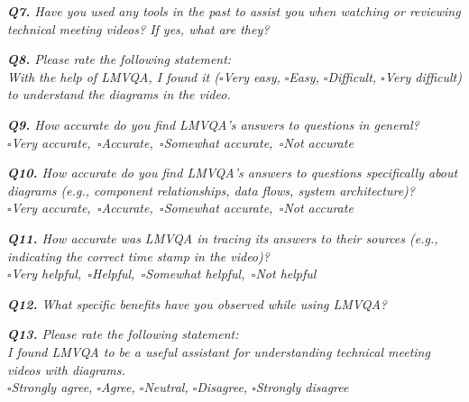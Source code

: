 \vspace*{1em}\noindent\textit{\textbf{Q7.} Have you used any tools in the past to assist you when watching or reviewing technical meeting videos? If yes, what are they?
}







\vspace*{1em}\noindent\textit{\textbf{Q8.} Please rate the following statement:
\\[.5em]
 \textit{With the help of LMVQA, I found it}
($\square$Very easy, $\square$Easy, $\square$Difficult, $\square$Very difficult)
to understand the diagrams in the video.
}


\vspace*{1em}\noindent\textit{\textbf{Q9.} How accurate do you find LMVQA's answers to questions in general?
\\[.5em]
        \indent $\square$Very accurate,\,
        $\square$Accurate,\,
        $\square$Somewhat accurate,\,
        $\square$Not accurate
}



\vspace*{1em}
\noindent\textit{\textbf{Q10.} How accurate do you find LMVQA's answers to questions specifically about diagrams (e.g., component relationships, data flows, system architecture)?
\\[.5em]
        \indent $\square$Very accurate,\,
        $\square$Accurate,\,
        $\square$Somewhat accurate,\,
        $\square$Not accurate
}



\vspace*{1em}
\noindent\textit{\textbf{Q11.} 
How accurate was LMVQA in tracing its answers to their sources
(e.g.,  indicating the correct time stamp in the video)?
\\[.5em]
\indent $\square$Very helpful,\,
$\square$Helpful,\,
$\square$Somewhat helpful,\,
$\square$Not helpful
}


\vspace*{1em}
\noindent\textit{\textbf{Q12.} What specific benefits have you observed while using LMVQA?
}


\vspace*{1em}\noindent\textit{\textbf{Q13.} Please rate the following statement:
\\[.5em]
\textit{I found LMVQA to be a useful assistant for understanding technical meeting videos with diagrams.}
\\[.5em]
\indent $\square$Strongly agree,
$\square$Agree,
$\square$Neutral,
$\square$Disagree,
$\square$Strongly disagree
}

